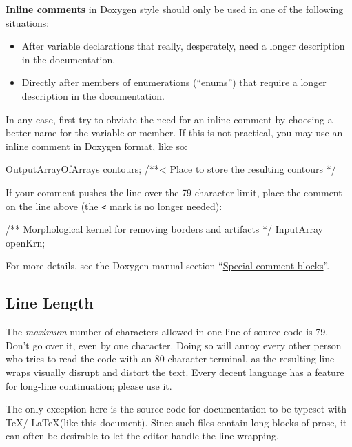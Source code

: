 \documentclass[12pt]{article}
\newcommand{\code}[1]{\texttt{#1}}
\newcommand{\textdef}[1]{\textbf{#1}}
\begin{document}
\textdef{Inline comments} in Doxygen style should only be used in one of the following situations:
\begin{itemize}
    \item After variable declarations that really, desperately, need a longer description in the documentation.
    \item Directly after members of enumerations (``enums'') that require a longer description in the documentation.
\end{itemize}
In any case, first try to obviate the need for an inline comment by choosing a better name for the variable or member. If this is not practical, you may use an inline comment in Doxygen format, like so:
\begin{codeex}
OutputArrayOfArrays contours; /**< Place to store the resulting contours */
\end{codeex}
If your comment pushes the line over the 79-character limit, place the comment on the line above (the \code{<} mark is no longer needed):
\begin{codeex}
/** Morphological kernel for removing borders and artifacts */
InputArray openKrn;
\end{codeex}

For more details, see the Doxygen manual \cite{doxyguide} section ``\href{http://www.stack.nl/~dimitri/doxygen/manual/docblocks.html#specialblock}{Special comment blocks}''.
\subsection{Line Length}
\label{sec:maxlinelength}
The \emph{maximum} number of characters allowed in one line of source code is 79. Don't go over it, even by one character. Doing so will annoy every other person who tries to read the code with an 80-character terminal, as the resulting line wraps visually disrupt and distort the text. Every decent language has a feature for long-line continuation; please use it. 

The only exception here is the source code for documentation to be typeset with \TeX / \LaTeX (like this document). Since such files contain long blocks of prose, it can often be desirable to let the editor handle the line wrapping.
\end{document}

